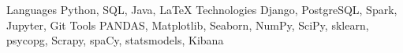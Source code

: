 


\begin{cvskills}

\cvskill
{Languages} %
{Python, SQL, Java, LaTeX} %
\cvskill
{Technologies}
{Django, PostgreSQL, Spark, Jupyter, Git}
\cvskill
{Tools}
{PANDAS, Matplotlib, Seaborn, NumPy, SciPy, sklearn, psycopg, Scrapy, spaCy, statsmodels, Kibana}


\end{cvskills}



